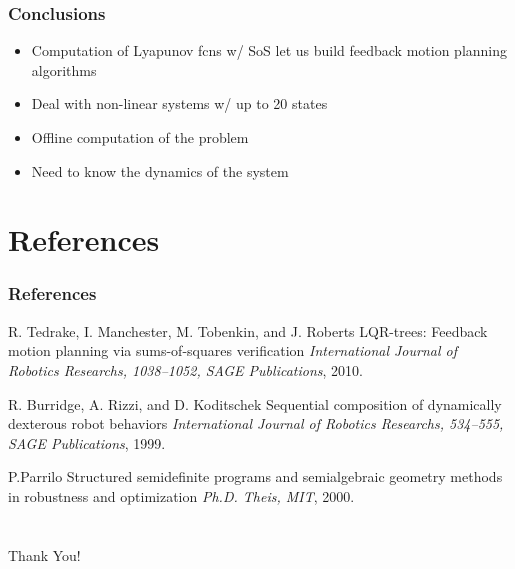\documentclass{beamer}
\begin{document}
\begin{frame}
\frametitle{Conclusions}
\begin{itemize}
\item Computation of Lyapunov fcns w/ SoS let us build feedback motion planning algorithms \vspace{.2cm}
\item Deal with non-linear systems w/ up to 20 states \vspace{.2cm}
\item Offline computation of the problem \vspace{.2cm}
\item Need to know the dynamics of the system \vspace{.2cm}
\end{itemize}
\end{frame}


\section{References}

\begin{frame}
\frametitle{References}
\footnotesize{
\begin{thebibliography}{99} %


 R. Tedrake, I. Manchester, M. Tobenkin, and J. Roberts
\newblock LQR-trees: Feedback motion planning via sums-of-squares verification
\newblock \emph{International Journal of Robotics Researchs, 1038--1052, SAGE Publications}, 2010.

 R. Burridge, A. Rizzi, and D. Koditschek
\newblock Sequential composition of dynamically dexterous robot behaviors
\newblock \emph{International Journal of Robotics Researchs, 534--555, SAGE Publications}, 1999.

 P.Parrilo
\newblock Structured semidefinite programs and semialgebraic geometry methods in robustness and optimization
\newblock \emph{Ph.D. Theis, MIT}, 2000.


\end{thebibliography}
}
\end{frame}

\section{}
\begin{frame}
\begin{center}
\Huge {Thank You!}
\end{center}
\end{frame}

\end{document}
